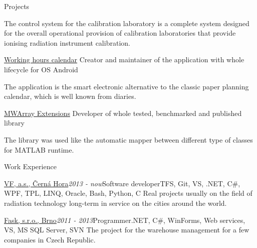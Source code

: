 \documentclass{cv} %
\begin{document}
\begin{rSection}{Projects}
\begin{rSubsection}
The control system for the calibration laboratory is a complete system designed for the overall operational provision of calibration laboratories that provide ionising radiation instrument calibration.
\end{rSubsection}

\begin{rSubsection}
{\href{https://play.google.com/store/apps/details?id=eu.jksoft.planningcalendar}{Working hours calendar}}{}
{Creator and maintainer of the application with whole lifecycle for OS Android}{}

The application is the smart electronic alternative to the classic paper planning calendar, which is well known from diaries.
\end{rSubsection}

\begin{rSubsection}
{\href{http://honzakuzel.eu/mwarrayextensions.html}{MWArray Extensions}}{}
{Developer of whole tested, benchmarked and published library}{}

The library was used like the automatic mapper between different type of classes for MATLAB runtime.
\end{rSubsection}

\end{rSection}


\begin{rSection}{Work Experience}

\begin{rSubsection}{\href{https://www.vfnuclear.com/en/}{VF, a.s., \v Cern\' a Hora}}{\em 2013 - now}{Software developer}{TFS, Git, VS, .NET, C\#, WPF, TPL, LINQ, Oracle, Bash, Python, C}
Real projects usually on the field of radiation technology long-term in service on the cities around the world.
\end{rSubsection}

\begin{rSubsection}{\href{http://www.fask.cz/}{Fask, s.r.o., Brno}}{\em 2011 - 2013}{Programmer}{.NET, C\#, WinForms, Web services, VS, MS SQL Server, SVN}
The project for the warehouse management for a few companies in Czech Republic.
\end{rSubsection}

\end{rSection}
\end{document}
